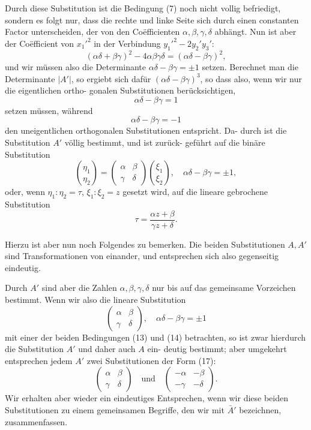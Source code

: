\documentclass[12pt,a4paper]{article}
\theoremstyle{plain}
\theoremstyle{definition}
\theoremstyle{remark}
\begin{document}
Durch diese Substitution ist die Bedingung (7) noch nicht
vollig befriedigt, sondern es folgt nur, dass die rechte und linke
Seite sich durch einen constanten Factor unterscheiden, der von
den Co\"efficienten $\alpha, \beta, \gamma, \delta$ abh\"angt. Nun ist aber der Co\"efficient
von $x_1'^2$ in der Verbindung $y_1'^2 - 2y_2'y_3'$:
\[
(\alpha\delta + \beta\gamma)^2 - 4\alpha\beta\gamma\delta = (\alpha\delta - \beta\gamma)^2,
\]
und wir m\"ussen also die Determinante $\alpha\delta - \beta\gamma = \pm 1$ setzen.
Berechnet man die Determinante $|A'|$, so ergiebt sich daf\"ur
$(\alpha\delta - \beta\gamma)^3$, so dass also, wenn wir nur die eigentlichen ortho-
gonalen Substitutionen ber\"ucksichtigen,
\begin{equation}\label{eq:49_13}
\alpha\delta - \beta\gamma = 1\tag{13}
\end{equation}
setzen m\"ussen, w\"ahrend
\begin{equation}\label{eq:49_14}
\alpha\delta - \beta\gamma = -1\tag{14}
\end{equation}
den uneigentlichen orthogonalen Substitutionen entspricht. Da-
durch ist die Substitution $A'$ v\"ollig bestimmt, und ist zur\"uck-
gef\"uhrt auf die bin\"are Substitution
\begin{equation}\label{eq:49_15}
\binom{\eta_1}{\eta_2} = \begin{pmatrix}\alpha & \beta\\ \gamma & \delta\end{pmatrix}\binom{\xi_1}{\xi_2},\quad \alpha\delta - \beta\gamma = \pm 1,\tag{15}
\end{equation}
oder, wenn $\eta_1 : \eta_2 = \tau$, $\xi_1 : \xi_2 = z$ gesetzt wird, auf die lineare
gebrochene Substitution
\[
\tau = \frac{\alpha z + \beta}{\gamma z + \delta}.
\]

Hierzu ist aber nun noch Folgendes zu bemerken. Die
beiden Substitutionen $A, A'$ sind Transformationen von einander,
und entsprechen sich also gegenseitig eindeutig.

Durch $A'$ sind aber die Zahlen $\alpha, \beta, \gamma, \delta$ nur bis auf das
gemeinsame Vorzeichen bestimmt. Wenn wir also die lineare
Substitution
\begin{equation}\label{eq:49_17}
\begin{pmatrix}\alpha & \beta\\ \gamma & \delta\end{pmatrix},\quad \alpha\delta - \beta\gamma = \pm 1\tag{17}
\end{equation}
mit einer der beiden Bedingungen (13) und (14) betrachten, so
ist zwar hierdurch die Substitution $A'$ und daher auch $A$ ein-
deutig bestimmt; aber umgekehrt entsprechen jedem $A'$ zwei
Substitutionen der Form (17):
\[
\begin{pmatrix}\alpha & \beta\\ \gamma & \delta\end{pmatrix}\quad\text{und}\quad
\begin{pmatrix}-\alpha & -\beta\\ -\gamma & -\delta\end{pmatrix}.
\]
Wir erhalten aber wieder ein eindeutiges Entsprechen, wenn
wir diese beiden Substitutionen zu einem gemeinsamen Begriffe,
den wir mit $\bar{A}'$ bezeichnen, zusammenfassen.
\end{document}

